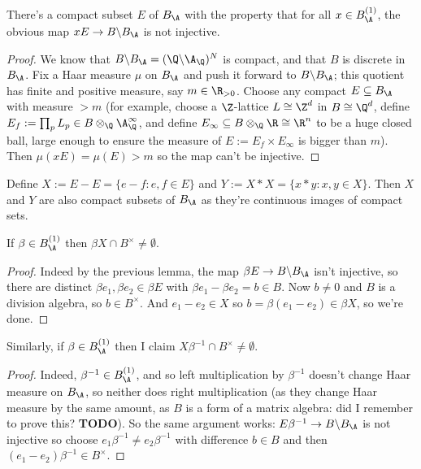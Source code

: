 \begin{lemma}
  \label{E}
  There's a compact subset $E$ of $B_{\A}$
  with the property that for all $x\in B_{\A}^{(1)}$,
  the obvious map $xE\to B\backslash B_{\A}$ is not injective.
\end{lemma}

\begin{proof} We know that $B\backslash B_{\A}=(\Q\backslash\A_{\Q})^N$
  is compact, and that $B$ is discrete in $B_{\A}$.
    Fix a Haar measure $\mu$ on $B_{\A}$ and push it forward
    to $B\backslash B_{\A}$; this quotient has finite
    and positive measure, say $m\in\R_{>0}$.
    Choose any compact $E\subseteq B_{\A}$ with measure $> m$
    (for example, choose a $\Z$-lattice $L\cong\Z^d$ in $B\cong\Q^d$,
    define $E_f:=\prod_p L_p\in B\otimes_{\Q}\A_{\Q}^\infty$,
    and define $E_{\infty}\subseteq B\otimes_{\Q}\R\cong\R^n$ to be a huge closed
    ball, large enough to ensure the measure of $E:=E_f\times E_{\infty}$ is bigger than $m$).
    Then $\mu(xE)=\mu(E)>m$ so the map can't be injective.
\end{proof}

Define $X:=E-E=\{e-f:e,f\in E\}$ and $Y:=X*X=\{x*y:x,y\in X\}$.
  Then $X$ and $Y$ are
  also compact subsets of $B_{\A}$ as they're continuous images
  of compact sets.

  \begin{lemma}
    \label{X_meets_kernel}
    If $\beta\in B_{\A}^{(1)}$ then
  $\beta X\cap B^\times\not=\emptyset$.
  \end{lemma}
  \begin{proof}
  Indeed by the previous lemma, the map $\beta E\to B\backslash B_{\A}$
  isn't injective, so there are distinct
  $\beta e_1,\beta e_2\in \beta E$ with
  $\beta e_1-\beta e_2=b\in B$.
  Now $b\not=0$ and $B$ is a division algebra, so $b\in B^\times$.
  And $e_1-e_2\in X$ so $b=\beta(e_1-e_2)\in \beta X$, so we're done.
\end{proof}

\begin{lemma}
  \label{X_meets_kernel'}
  Similarly, if $\beta\in B_{\A}^{(1)}$ then I claim
  $X\beta^{-1}\cap B^\times\not=\emptyset$.
\end{lemma}
\begin{proof}
  Indeed, $\beta^{-1}\in B_{\A}^{(1)}$, and so left multiplication by $\beta^{-1}$
  doesn't change Haar measure on $B_{\A}$, so neither does right multiplication
  (as they change Haar measure by the same amount, as $B$ is a form of a matrix
  algebra: did I remember to prove this? {\bf TODO}).
  So the same argument works: $E\beta^{-1}\to B\backslash B_{\A}$ is not
  injective so choose $e_1\beta^{-1}\not=e_2\beta^{-1}$ with difference $b\in B$
  and then $(e_1-e_2)\beta^{-1}\in B^\times$.
\end{proof}

